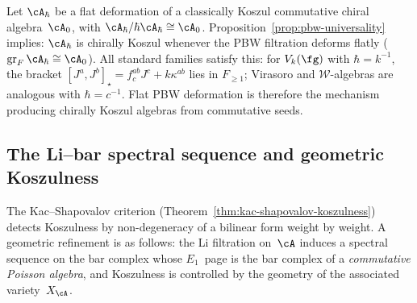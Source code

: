 \begin{remark}
\label{rem:dq-koszul-compatibility}

Let $\cA_\hbar$ be a flat deformation of a classically Koszul
commutative chiral algebra~$\cA_0$, with
$\cA_\hbar/\hbar\cA_\hbar \cong \cA_0$.
Proposition~\ref{prop:pbw-universality} implies: $\cA_\hbar$ is
chirally Koszul whenever the PBW filtration deforms flatly
($\operatorname{gr}_F \cA_\hbar \cong \cA_0$). All standard
families satisfy this: for $V_k(\fg)$ with $\hbar = k^{-1}$, the
bracket $[J^a, J^b]_\star = f^{ab}_c J^c + k\kappa^{ab}$ lies in
$F_{\geq 1}$; Virasoro and $\mathcal{W}$-algebras are analogous
with $\hbar = c^{-1}$. Flat PBW deformation is therefore the
mechanism producing chirally Koszul algebras from commutative seeds.
\end{remark}

\subsection{The Li--bar spectral sequence and geometric Koszulness}
\label{subsec:li-bar-geometric-koszulness}

The Kac--Shapovalov criterion
(Theorem~\ref{thm:kac-shapovalov-koszulness}) detects Koszulness
by non-degeneracy of a bilinear form weight by weight. A geometric
refinement is as follows: the Li filtration on~$\cA$ induces a
spectral sequence on the bar complex whose $E_1$~page is the bar
complex of a \emph{commutative Poisson algebra}, and Koszulness
is controlled by the geometry of the associated variety~$X_\cA$.

